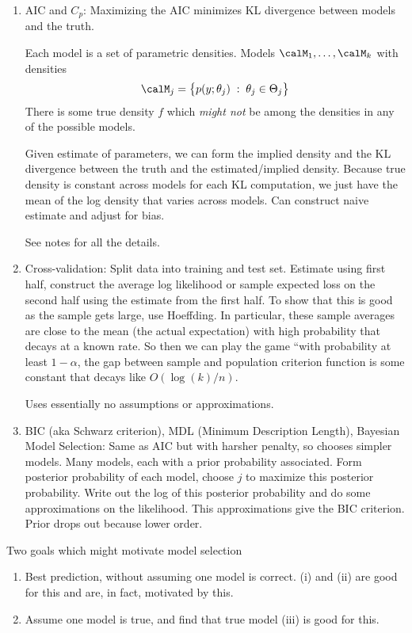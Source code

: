 \documentclass[12pt]{article}
\theoremstyle{plain}
\theoremstyle{definition}
\theoremstyle{remark}
\begin{document}
\begin{enumerate}[label=(\roman*)]
  \item AIC and $C_p$:
    Maximizing the AIC minimizes KL divergence between models and the
    truth.

    Each model is a set of parametric densities.
    Models $\calM_1,\ldots,\calM_k$ with densities
    \begin{align*}
      \calM_j
      =
      \big\{
        p(y;\theta_j)\;:\;
        \theta_j \in \Theta_j
      \big\}
    \end{align*}
    There is some true density $f$ which \emph{might not} be among the
    densities in any of the possible models.

    Given estimate of parameters, we can form the implied density and
    the KL divergence between the truth and the estimated/implied
    density.
    Because true density is constant across models for each KL
    computation, we just have the mean of the log density that varies
    across models.
    Can construct naive estimate and adjust for bias.

    See notes for all the details.

  \item Cross-validation:
    Split data into training and test set.
    Estimate using first half, construct the average log likelihood or
    sample expected loss on the second half using the estimate from the
    first half.
    To show that this is good as the sample gets large, use Hoeffding.
    In particular, these sample averages are close to the mean (the
    actual expectation) with high probability that decays at a known
    rate.
    So then we can play the game ``with probability at least $1-\alpha$,
    the gap between sample and population criterion function is
    some constant that decays like $O(\log(k)/n)$.

    Uses essentially no assumptions or approximations.

  \item BIC (aka Schwarz criterion), MDL (Minimum Description Length),
    Bayesian Model Selection:
    Same as AIC but with harsher penalty, so chooses simpler models.
    Many models, each with a prior probability associated.
    Form posterior probability of each model, choose $j$ to maximize
    this posterior probability.
    Write out the log of this posterior probability and do some
    approximations on the likelihood.
    This approximations give the BIC criterion.
    Prior drops out because lower order.
\end{enumerate}
Two goals which might motivate model selection
\begin{enumerate}
  \item Best prediction, without assuming one model is correct.
    (i) and (ii) are good for this and are, in fact, motivated by this.
  \item Assume one model is true, and find that true model
    (iii) is good for this.
\end{enumerate}
\end{document}
